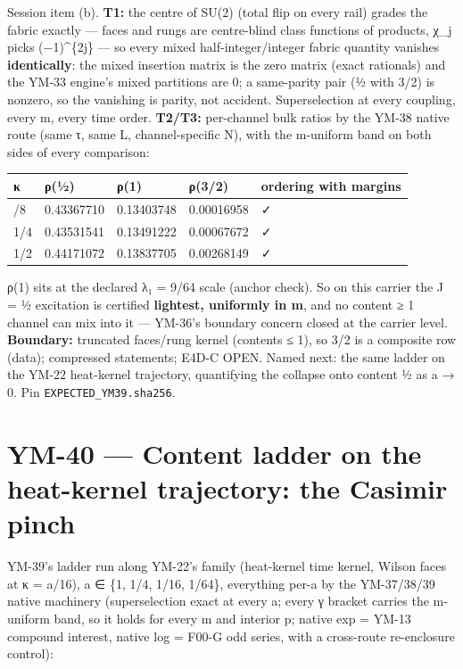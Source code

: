 Session item (b). \textbf{T1:} the centre of SU(2) (total flip on every rail) grades the fabric exactly --- faces and rungs are centre-blind class functions of products, χ\_j picks (−1)\^{}\{2j\} --- so every mixed half-integer/integer fabric quantity vanishes \textbf{identically}: the mixed insertion matrix is the zero matrix (exact rationals) and the YM-33 engine's mixed partitions are 0; a same-parity pair (½ with 3/2) is nonzero, so the vanishing is parity, not accident. Superselection at every coupling, every m, every time order. \textbf{T2/T3:} per-channel bulk ratios by the YM-38 native route (same τ, same L, channel-specific N), with the m-uniform band on both sides of every comparison:

\begin{longtable}[]{@{}lllll@{}}
\toprule\noalign{}
κ & ρ(½) & ρ(1) & ρ(3/2) & ordering with margins \\
\midrule\noalign{}
\endhead
\bottomrule\noalign{}
\endlastfoot
1/8 & 0.43367710 & 0.13403748 & 0.00016958 & ✓ \\
1/4 & 0.43531541 & 0.13491222 & 0.00067672 & ✓ \\
1/2 & 0.44171072 & 0.13837705 & 0.00268149 & ✓ \\
\end{longtable}

ρ(1) sits at the declared λ₁ = 9/64 scale (anchor check). So on this carrier the J = ½ excitation is certified \textbf{lightest, uniformly in m}, and no content ≥ 1 channel can mix into it --- YM-36's boundary concern closed at the carrier level. \textbf{Boundary:} truncated faces/rung kernel (contents ≤ 1), so 3/2 is a composite row (data); compressed statements; E4D-C OPEN. Named next: the same ladder on the YM-22 heat-kernel trajectory, quantifying the collapse onto content ½ as a → 0. Pin \texttt{EXPECTED\_YM39.sha256}.

\hypertarget{ym-40-content-ladder-on-the-heat-kernel-trajectory-the-casimir-pinch}{%
\section{YM-40 --- Content ladder on the heat-kernel trajectory: the Casimir pinch}\label{ym-40-content-ladder-on-the-heat-kernel-trajectory-the-casimir-pinch}}

YM-39's ladder run along YM-22's family (heat-kernel time kernel, Wilson faces at κ = a/16), a ∈ \{1, 1/4, 1/16, 1/64\}, everything per-a by the YM-37/38/39 native machinery (superselection exact at every a; every γ bracket carries the m-uniform band, so it holds for every m and interior p; native exp = YM-13 compound interest, native log = F00-G odd series, with a cross-route re-enclosure control):


